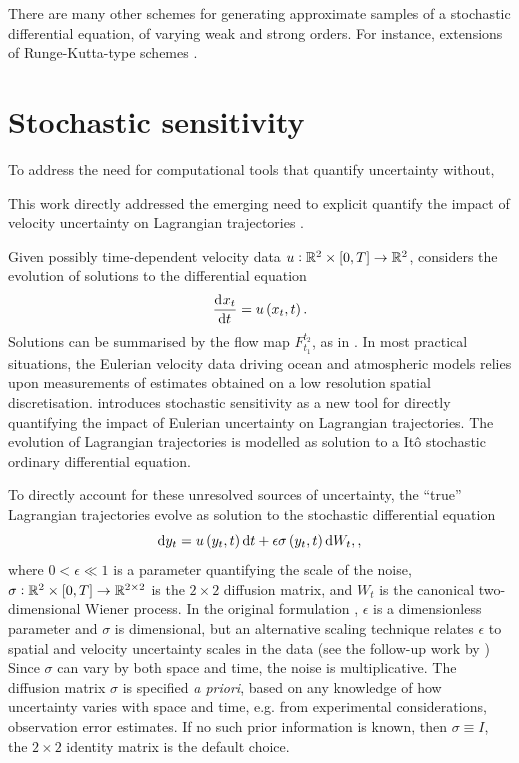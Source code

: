 There are many other schemes for generating approximate samples of a stochastic differential equation, of varying weak and strong orders.
For instance, extensions of Runge-Kutta-type schemes \citep{Roberts_2012_ModifyImprovedEuler,Rossler_2010_RungeKuttaMethodsStrong}.



\section{Stochastic sensitivity}
To address the need for computational tools that quantify uncertainty without,

This work directly addressed the emerging need to explicit quantify the impact of velocity uncertainty on Lagrangian trajectories \citep{Balasuriya_2020_StochasticApproachesLagrangian,BalasuriyaGottwald_2018_EstimatingStableUnstable,BranickiUda_2021_LagrangianUncertaintyQuantification,HallerEtAl_2018_MaterialBarriersDiffusive}.


Given possibly time-dependent velocity data \(u: \mathbb{R}^2 \times [0,T] \to \mathbb{R}^2\), \citet{Balasuriya_2020_StochasticSensitivityComputable} considers the evolution of solutions to the differential equation
\[
	\dod{x_t}{t} = u\left(x_t, t\right).
\]
Solutions can be summarised by the flow map \(F_{t_1}^{t_2}\), as in .
In most practical situations, the Eulerian velocity data driving ocean and atmospheric models relies upon measurements of estimates obtained on a low resolution spatial discretisation.
\citet{Balasuriya_2020_StochasticSensitivityComputable} introduces stochastic sensitivity as a new tool for directly quantifying the impact of Eulerian uncertainty on Lagrangian trajectories.
The evolution of Lagrangian trajectories is modelled as solution to a It\^o stochastic ordinary differential equation.

To directly account for these unresolved sources of uncertainty, the ``true'' Lagrangian trajectories evolve as solution to the stochastic differential equation
\begin{equation}
	\sde{y_t}{u\left(y_t, t\right)}{\epsilon\sigma\left(y_t, t\right)},
	\label{eqn:ss_sde},
\end{equation}
where \(0 < \epsilon \ll 1\) is a parameter quantifying the scale of the noise, \(\sigma:	\mathbb{R}^2\times[0,T] \to \mathbb{R}^{2\times 2}\) is the \(2\times 2\) diffusion matrix, and \(W_t\) is the canonical two-dimensional Wiener process.
In the original formulation \citep{Balasuriya_2020_StochasticSensitivityComputable}, \(\epsilon\) is a dimensionless parameter and \(\sigma\) is dimensional, but an alternative scaling technique relates \(\epsilon\) to spatial and velocity uncertainty scales in the data (see the follow-up work by \citet{BadzaEtAl_2023_HowSensitiveAre,Balasuriya_2020_UncertaintyFinitetimeLyapunov,FangEtAl_2020_DisentanglingResolutionPrecision})
Since \(\sigma\) can vary by both space and time, the noise is multiplicative.
The diffusion matrix \(\sigma\) is specified \emph{a priori}, based on any knowledge of how uncertainty varies with space and time, e.g. from experimental considerations, observation error estimates.
If no such prior information is known, then \(\sigma \equiv I\), the \(2 \times 2\) identity matrix is the default choice.

